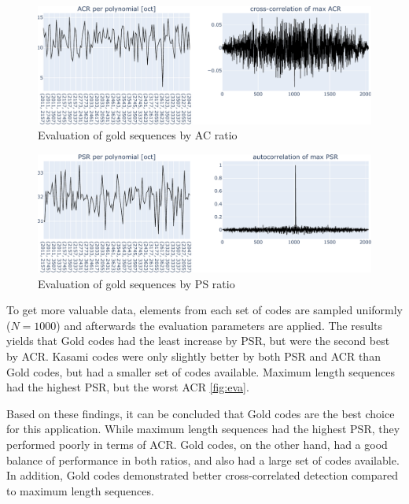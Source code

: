 %	
%
%	
\begin{figure}
	\includegraphics[width=\linewidth]{images/goldevaacr}
	\caption{Evaluation of gold sequences by AC ratio}
	\label{fig:evagoldacr}
\end{figure}
\begin{figure}
	\includegraphics[width=\linewidth]{images/goldevapsr}
	\caption{Evaluation of gold sequences by PS ratio}
	\label{fig:evagoldpsr}
\end{figure}
To get more valuable data, elements from each set of codes are sampled uniformly ($N=1000$) and afterwards the evaluation parameters are applied.
The results yields that Gold codes had the least increase by PSR, but were the second best by ACR. Kasami codes were only slightly better by both PSR and ACR than Gold codes, but had a smaller set of codes available. Maximum length sequences had the highest PSR, but the worst ACR \ref{fig:eva}.

Based on these findings, it can be concluded that Gold codes are the best choice for this application. While maximum length sequences had the highest PSR, they performed poorly in terms of ACR. Gold codes, on the other hand, had a good balance of performance in both ratios, and also had a large set of codes available. In addition, Gold codes demonstrated better cross-correlated detection compared to maximum length sequences.

